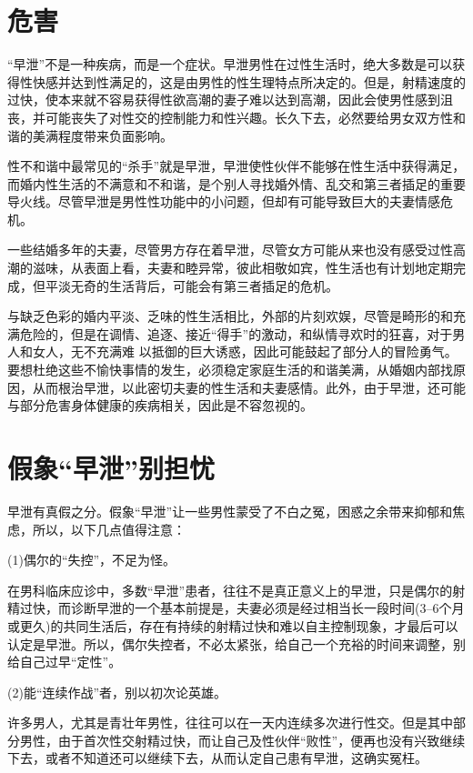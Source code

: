 \documentclass[12pt,UTF8]{ctexbook}
\begin{document}
\section{危害}

“早泄”不是一种疾病，而是一个症状。早泄男性在过性生活时，绝大多数是可以获得性快感并达到性满足的，这是由男性的性生理特点所决定的。但是，射精速度的过快，使本来就不容易获得性欲高潮的妻子难以达到高潮，因此会使男性感到沮丧，并可能丧失了对性交的控制能力和性兴趣。长久下去，必然要给男女双方性和谐的美满程度带来负面影响。

性不和谐中最常见的“杀手”就是早泄，早泄使性伙伴不能够在性生活中获得满足，而婚内性生活的不满意和不和谐，是个别人寻找婚外情、乱交和第三者插足的重要导火线。尽管早泄是男性性功能中的小问题，但却有可能导致巨大的夫妻情感危机。

一些结婚多年的夫妻，尽管男方存在着早泄，尽管女方可能从来也没有感受过性高潮的滋味，从表面上看，夫妻和睦异常，彼此相敬如宾，性生活也有计划地定期完成，但平淡无奇的生活背后，可能会有第三者插足的危机。

与缺乏色彩的婚内平淡、乏味的性生活相比，外部的片刻欢娱，尽管是畸形的和充满危险的，但是在调情、追逐、接近“得手”的激动，和纵情寻欢时的狂喜，对于男人和女人，无不充满难
以抵御的巨大诱惑，因此可能鼓起了部分人的冒险勇气。要想杜绝这些不愉快事情的发生，必须稳定家庭生活的和谐美满，从婚姻内部找原因，从而根治早泄，以此密切夫妻的性生活和夫妻感情。此外，由于早泄，还可能与部分危害身体健康的疾病相关，因此是不容忽视的。

\section{假象“早泄”别担忧}

早泄有真假之分。假象“早泄”让一些男性蒙受了不白之冤，困惑之余带来抑郁和焦虑，所以，以下几点值得注意：

(1)偶尔的“失控”，不足为怪。

在男科临床应诊中，多数“早泄”患者，往往不是真正意义上的早泄，只是偶尔的射精过快，而诊断早泄的一个基本前提是，夫妻必须是经过相当长一段时间(3--6个月或更久)的共同生活后，存在有持续的射精过快和难以自主控制现象，才最后可以认定是早泄。所以，偶尔失控者，不必太紧张，给自己一个充裕的时间来调整，别给自己过早“定性”。

(2)能“连续作战”者，别以初次论英雄。

许多男人，尤其是青壮年男性，往往可以在一天内连续多次进行性交。但是其中部分男性，由于首次性交射精过快，而让自己及性伙伴“败性”，便再也没有兴致继续下去，或者不知道还可以继续下去，从而认定自己患有早泄，这确实冤枉。
\end{document}
